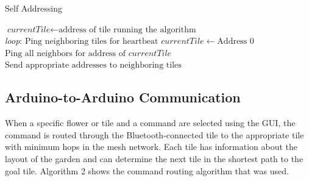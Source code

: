 \documentclass[letterpaper, 10 pt, conference]{ieeeconf}  %
\begin{document}
\begin{algorithm}
\caption{Self Addressing}\label{euclid}
\begin{algorithmic}[1]
\State $\textit{currentTile} \gets \text{address of tile running the algorithm}$\\

\BState \emph{loop}:
\State $\text{Ping neighboring tiles for heartbeat}$
\State $currentTile \gets \text{Address 0}$
\Else 
\State $\text{Ping all neighbors for address of } \textit{currentTile}$
\EndIf
\Else
\State $\text{Send appropriate addresses to neighboring tiles}$

\EndIf
\EndProcedure
\end{algorithmic}
\label{fig: alg1}
\end{algorithm}

\subsection{\textbf{Arduino-to-Arduino Communication}}
When a specific flower or tile and a command are selected using the GUI, the command is routed through the Bluetooth-connected tile to the appropriate tile with minimum hops in the mesh network.  Each tile has information about the layout of the garden and can determine the next tile in the shortest path to the goal tile.  Algorithm 2 shows the command routing algorithm that was used.
\end{document}
